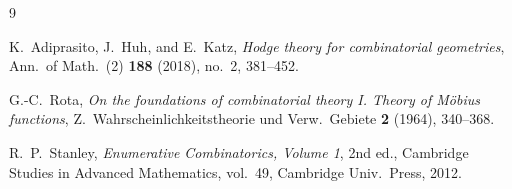 \documentclass[11pt]{article}
\theoremstyle{definition}
\theoremstyle{remark}
\begin{document}
\begin{thebibliography}{9}

K.~Adiprasito, J.~Huh, and E.~Katz,
\emph{Hodge theory for combinatorial geometries},
Ann.\ of Math.\ (2) \textbf{188} (2018), no.~2, 381--452.

G.-C.~Rota,
\emph{On the foundations of combinatorial theory I. Theory of M\"obius functions},
Z.\ Wahrscheinlichkeitstheorie und Verw.\ Gebiete \textbf{2} (1964), 340--368.

R.~P.~Stanley,
\emph{Enumerative Combinatorics, Volume 1}, 2nd ed.,
Cambridge Studies in Advanced Mathematics, vol.~49, Cambridge Univ.\ Press, 2012.

\end{thebibliography}
\end{document}
